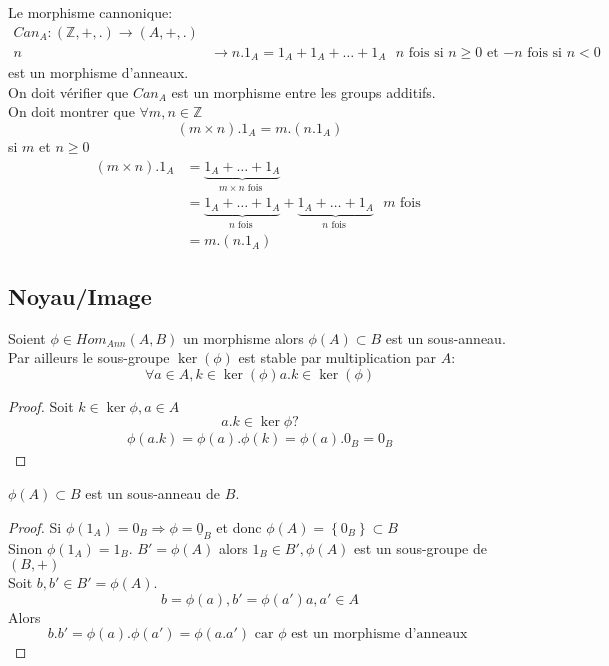 \documentclass[../main.tex]{subfiles}
\begin{document}
\begin{exemple}
Le morphisme cannonique:
\begin{align*}
Can_A : ( \mathbb{Z}, + , .) \to ( A, +, .)\\
n &\to n. 1_A = 1_A + 1_A + \ldots + 1_A \text{ $n$ fois si $n \geq 0$ et $-n$ fois si $n<0$ } 
\end{align*}
est un morphisme d'anneaux.\\
On doit vérifier que $Can_A$ est un morphisme entre les groups additifs.\\
On doit montrer que $\forall m,n \in \mathbb{Z}$ 
\[ 
	( m \times n). 1_A = m. ( n.1_A)
\]
si $m$ et $n \geq 0$ 
\begin{align*}
	( m\times n) . 1_A &= \underbrace{1_A + \ldots + 1_A}_{m \times n \text{ fois } }\\
			   &= \underbrace{1_A + \ldots + 1_A }_{n \text{ fois } } + \underbrace{1_A + \ldots + 1_A}_{n \text{ fois } } \text{ $m$ fois } \\
			   &= m.(n.1_A)
\end{align*}


\end{exemple}
\subsection{Noyau/Image}
\begin{propo}
Soient $\phi \in Hom _{Ann} ( A,B)$ un morphisme alors $\phi(A) \subset B$ est un sous-anneau. Par ailleurs le sous-groupe $\ker(\phi)$ est stable par multiplication par $A$:
\[ 
	\forall a \in A, k \in \ker(\phi) a.k \in \ker(\phi)
\]
\end{propo}

\begin{proof}
Soit $k \in \ker \phi, a \in A$ 
\[ 
a.k \in \ker \phi ?
\]
\begin{align*}
	\phi(a.k) = \phi(a) . \phi(k) = \phi(a) . 0_B = 0_B
\end{align*}

\end{proof}
\begin{thm}
	$\phi(A) \subset B$ est un sous-anneau de $B$.
\end{thm}
\begin{proof}
	Si $\phi(1_A) = 0_B \Rightarrow \phi = \underline{0}_B$ et donc
	$\phi(A) = \left\{ 0_B \right\} \subset B$\\
	Sinon $\phi(1_A) = 1_B$.
	$B'= \phi(A)$ alors $1_B \in B', \phi(A)$ est un sous-groupe de $(B,+)$ \\
	Soit $b,b' \in B'= \phi(A)$.
	\[ 
		b = \phi(a) , b'= \phi(a')  a,a' \in A
	\]
	Alors
	\[ 
		b.b' = \phi(a) . \phi(a') = \phi(a.a') \text{ car $\phi$ est un morphisme d'anneaux } 
	\]
	
\end{proof}
\end{document}
